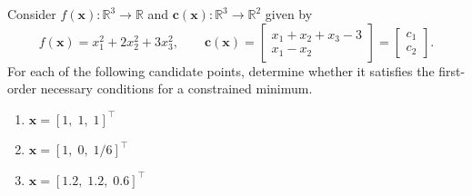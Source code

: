 \begin{exercise} %
    Consider $f(\mathbf{x}) : \mathbb{R}^3 \to \mathbb{R}$ and $\mathbf{c}(\mathbf{x}) : \mathbb{R}^3 \to \mathbb{R}^2$ given by
    \[
        f(\mathbf{x}) = x_1^2 + 2x_2^2 + 3x_3^2,
        \qquad
        \mathbf{c}(\mathbf{x}) =
        \begin{bmatrix}
            x_1 + x_2 + x_3 - 3 \\
            x_1 - x_2
        \end{bmatrix}
        =
        \begin{bmatrix}
            c_1 \\ c_2
        \end{bmatrix}.
    \]
    For each of the following candidate points, determine whether it satisfies the first-order necessary conditions for a constrained minimum.
    \begin{enumerate}[label=(\alph*)]
        \item $\mathbf{x} = [1,\; 1,\; 1]^\top$
        \item $\mathbf{x} = [1,\; 0,\; 1/6]^\top$
        \item $\mathbf{x} = [1.2,\; 1.2,\; 0.6]^\top$
    \end{enumerate}
\end{exercise}

